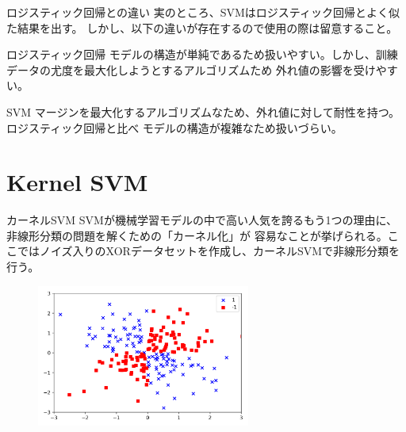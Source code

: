 \documentclass[aspectratio=169, dvipdfmx, 11pt]{beamer} %
\begin{document}
\begin{frame}{ロジスティック回帰との違い}
    実のところ、SVMはロジスティック回帰とよく似た結果を出す。
    しかし、以下の違いが存在するので使用の際は留意すること。
    \begin{alertblock}{ロジスティック回帰}
        モデルの構造が単純であるため扱いやすい。しかし、訓練データの尤度を最大化しようとするアルゴリズムため
        外れ値の影響を受けやすい。
    \end{alertblock}
    \begin{exampleblock}{SVM}
        マージンを最大化するアルゴリズムなため、外れ値に対して耐性を持つ。ロジスティック回帰と比べ
        モデルの構造が複雑なため扱いづらい。
    \end{exampleblock}
\end{frame}

\section{Kernel SVM}
\begin{frame}{カーネルSVM}
    SVMが機械学習モデルの中で高い人気を誇るもう1つの理由に、非線形分類の問題を解くための「カーネル化」が
    容易なことが挙げられる。ここではノイズ入りのXORデータセットを作成し、カーネルSVMで非線形分類を行う。
    \begin{figure}[b]
        \begin{center}
        \includegraphics[width=70mm]{img/day02/fig07.png}
        \end{center}
    \end{figure}
\end{frame}
\end{document}
